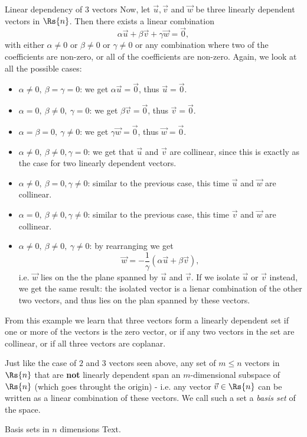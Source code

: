 \begin{example}{Linear dependency of $3$ vectors}{}
	Now, let $\vec{u},\vec{v}$ and $\vec{w}$ be three linearly dependent vectors in $\Rs{n}$. Then there exists a linear combination
	\[
		\alpha\vec{u} + \beta\vec{v} + \gamma\vec{w} = \vec{0},
	\]
	with either $\alpha\neq0$ or $\beta\neq0$ or $\gamma\neq0$ or any combination where two of the coefficients are non-zero, or all of the coefficients are non-zero. Again, we look at all the possible cases:
	\begin{itemize}
		\item $\alpha\neq0,\ \beta=\gamma=0$: we get $\alpha\vec{u} = \vec{0}$, thus $\vec{u}=\vec{0}$.
		\item $\alpha=0,\ \beta\neq0,\ \gamma=0$: we get $\beta\vec{v} = \vec{0}$, thus $\vec{v}=\vec{0}$.
		\item $\alpha=\beta=0,\ \gamma\neq0$: we get $\gamma\vec{w} = \vec{0}$, thus $\vec{w}=\vec{0}$.
		\item $\alpha\neq0,\ \beta\neq0, \gamma=0$: we get that $\vec{u}$ and $\vec{v}$ are collinear, since this is exactly as the case for two linearly dependent vectors.
		\item $\alpha\neq0,\ \beta=0, \gamma\neq0$: similar to the previous case, this time $\vec{u}$ and $\vec{w}$ are collinear.
		\item $\alpha=0,\ \beta\neq0, \gamma\neq0$: similar to the previous case, this time $\vec{v}$ and $\vec{w}$ are collinear.
		\item $\alpha\neq0,\ \beta\neq0,\ \gamma\neq0$: by rearranging we get
			\[
				\vec{w} = -\frac{1}{\gamma}\left( \alpha\vec{u} + \beta\vec{v} \right),
			\]
			i.e. $\vec{w}$ lies on the the plane spanned by $\vec{u}$ and $\vec{v}$. If we isolate $\vec{u}$ or $\vec{v}$ instead, we get the same result: the isolated vector is a lienar combination of the other two vectors, and thus lies on the plan spanned by these vectors.
	\end{itemize}
	From this example we learn that three vectors form a linearly dependent set if one or more of the vectors is the zero vector, or if any two vectors in the set are collinear, or if all three vectors are coplanar.
\end{example}

Just like the case of $2$ and $3$ vectors seen above, any set of $m\leq n$ vectors in $\Rs{n}$ that are \textbf{not} linearly dependent span an $m$-dimensional subspace of $\Rs{n}$ (which goes throught the origin) - i.e. any vector $\vec{v}\in\Rs{n}$ can be written as a linear combination of these vectors. We call such a set a \emph{basis set} of the space.

\begin{example}{Basis sets in $n$ dimensions}{}
	Text.
\end{example}

\Blindtext
